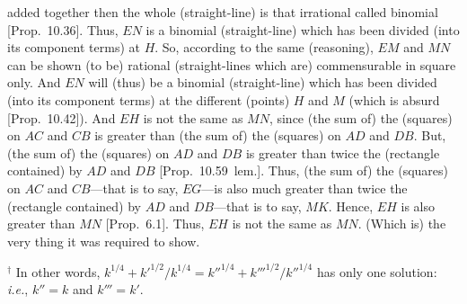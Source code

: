 \begin{Parallel}{}{}
{added together then the whole (straight-line) is that irrational called
binomial [Prop.~10.36]. Thus, $EN$
is a binomial (straight-line) which has been divided (into its component terms) at $H$. So, according to
the same (reasoning), $EM$ and $MN$ can be shown (to be) rational
(straight-lines which are) commensurable in square only. And $EN$
will (thus) be a binomial (straight-line) which has been divided (into its component terms) at the different (points)
$H$ and $M$ (which is absurd [Prop.~10.42]).
And $EH$ is not the same as $MN$, since (the sum of) the
(squares) on $AC$ and $CB$ is greater than (the sum of) the (squares) on
$AD$ and $DB$. But, (the sum of) the (squares) on $AD$ and $DB$
is greater than twice the (rectangle contained) by $AD$ and $DB$ [Prop.~10.59~lem.]. Thus,  (the sum of) the (squares) on $AC$ and $CB$---that is to say, $EG$---is also much greater than twice the (rectangle contained) by 
$AD$ and $DB$---that is to say, $MK$. Hence, $EH$ is also greater
than $MN$ [Prop.~6.1]. Thus, $EH$ is not the same as $MN$. (Which is) the very thing
it was required to show.}
\end{Parallel}
{\footnotesize\noindent$^\dag$ In other words, $k^{1/4}+{k'}^{1/2}/k^{1/4}
= {k''}^{1/4}+{k'''}^{1/2}/{k''}^{1/4}$
has only one solution: {\em i.e.}, $k''=k$ and $k'''=k'$.}

